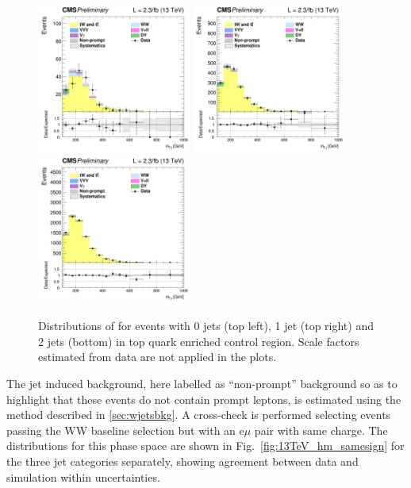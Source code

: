 \begin{figure}[!htb]
\centering
\includegraphics[width=0.45\textwidth]{images/13TeV/HighMass/cratio_hww2l2v_13TeV_top_of0j_mTi.png}
\includegraphics[width=0.45\textwidth]{images/13TeV/HighMass/cratio_hww2l2v_13TeV_top_of1j_mTi.png}
\includegraphics[width=0.45\textwidth]{images/13TeV/HighMass/cratio_hww2l2v_13TeV_top_of2j_mTi.png}
\caption{
Distributions of \mti for events with 0 jets (top left), 1 jet (top right)
and 2 jets (bottom) in top quark enriched control region.
Scale factors estimated from data are not applied in the plots. %
}
\label{fig:TopCtrl}
\end{figure}

The jet induced background, here labelled as ``non-prompt'' background so as to highlight that these events do not contain prompt leptons, is estimated using the method described in \ref{sec:wjetsbkg}. A cross-check is performed selecting events passing the WW baseline selection but with an e$\mu$ pair with same charge. The \mti distributions for this phase space are shown in Fig.~\ref{fig:13TeV_hm_samesign} for the three jet categories separately, showing agreement between data and simulation within uncertainties.

